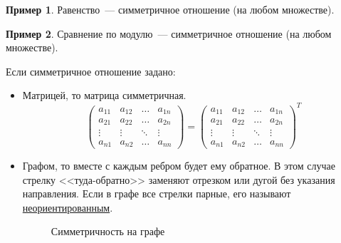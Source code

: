 \documentclass[russian]{lecture-notes}
\theoremstyle{definition}
\newtheorem{example*}{Пример}[subsection]
\begin{document}
\begin{example*}
	Равенство~--- симметричное отношение (на любом множестве).
\end{example*}

\begin{example*}
	Сравнение по модулю~--- симметричное отношение (на любом множестве).
\end{example*}

Если симметричное отношение задано:
\begin{itemize}
	\item Матрицей, то матрица симметричная.
	\begin{equation*}
	\left(
	\begin{array}{cccc}
	a_{11} & a_{12} & \ldots & a_{1n}\\
	a_{21} & a_{22} & \ldots & a_{2n}\\
	\vdots & \vdots & \ddots & \vdots\\
	a_{n1} & a_{n2} & \ldots & a_{nn}
	\end{array}
	\right) 
	= 
	\left(
	\begin{array}{cccc}
	a_{11} & a_{12} & \ldots & a_{1n}\\
	a_{21} & a_{22} & \ldots & a_{2n}\\
	\vdots & \vdots & \ddots & \vdots\\
	a_{n1} & a_{n2} & \ldots & a_{nn}
	\end{array}
	\right)^T
	\end{equation*}
	
	\item Графом, то вместе с каждым ребром будет ему обратное. В этом случае стрелку <<туда-обратно>> заменяют отрезком или дугой без указания направления. Если в графе все стрелки парные, его называют \underline{неориентированным}.
	\begin{figure}[H]
		\begin{subfigure}[H]{0.49\linewidth}
			\centering
			\label{fig:simmetr1}
		\end{subfigure}
		\hfill
		\begin{subfigure}[H]{0.49\linewidth}
			\centering
			\label{fig:simmetr2}
		\end{subfigure}
	\caption{\small Симметричность на графе}
	\label{fig:simmetr}
	\end{figure}
\end{itemize}
\end{document}
